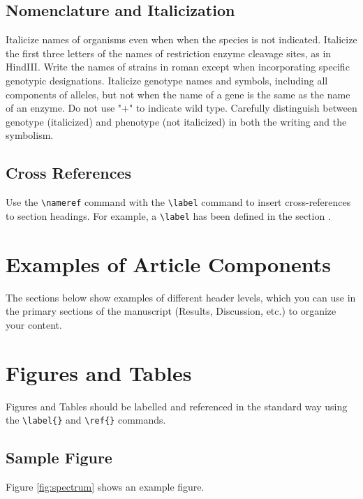 \documentclass[9pt,twocolumn,twoside,lineno]{gsajnl}
\begin{document}
\subsection{Nomenclature and Italicization} Italicize names of organisms even when  when the species is not indicated.  Italicize the first three letters of the names of restriction enzyme cleavage sites, as in HindIII. Write the names of strains in roman except when incorporating specific genotypic designations. Italicize genotype names and symbols, including all components of alleles, but not when the name of a gene is the same as the name of an enzyme. Do not use "+" to indicate wild type. Carefully distinguish between genotype (italicized) and phenotype (not italicized) in both the writing and the symbolism.

\subsection{Cross References}
Use the \verb|\nameref| command with the \verb|\label| command to insert cross-references to section headings. For example, a \verb|\label| has been defined in the section .



\section{Examples of Article Components}
\label{sec:examples}

The sections below show examples of different header levels, which you can use in the primary sections of the manuscript (Results, Discussion, etc.) to organize your content.

\section{Figures and Tables}

Figures and Tables should be labelled and referenced in the standard way using the \verb|\label{}| and \verb|\ref{}| commands.

\subsection{Sample Figure}

Figure \ref{fig:spectrum} shows an example figure.
\end{document}
